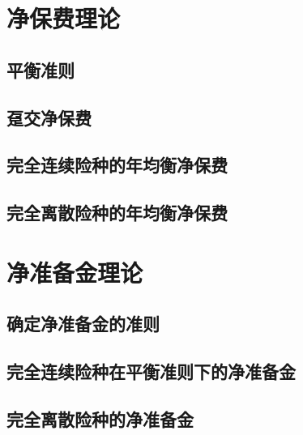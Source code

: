 \documentclass[lang=cn,10pt]{elegantbook}
\begin{document}
\chapter{净保费理论}
\section{平衡准则}

\section{趸交净保费}

\section{完全连续险种的年均衡净保费}

\section{完全离散险种的年均衡净保费}


\chapter{净准备金理论}
\section{确定净准备金的准则}

\section{完全连续险种在平衡准则下的净准备金}

\section{完全离散险种的净准备金}
\end{document}
